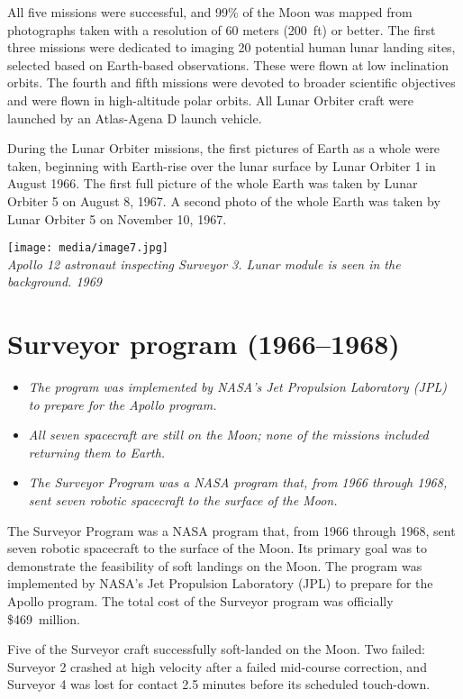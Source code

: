 All five missions were successful, and 99\% of the Moon was mapped from
photographs taken with a resolution of 60 meters (200~ft) or better. The
first three missions were dedicated to imaging 20 potential human lunar
landing sites, selected based on Earth-based observations. These were
flown at low inclination orbits. The fourth and fifth missions were
devoted to broader scientific objectives and were flown in high-altitude
polar orbits. All Lunar Orbiter craft were launched by an Atlas-Agena D
launch vehicle.

During the Lunar Orbiter missions, the first pictures of Earth as a
whole were taken, beginning with Earth-rise over the lunar surface by
Lunar Orbiter 1 in August 1966. The first full picture of the whole
Earth was taken by Lunar Orbiter 5 on August 8, 1967. A second photo of
the whole Earth was taken by Lunar Orbiter 5 on November 10, 1967.

\texttt{[image: media/image7.jpg]}\\
\emph{Apollo 12 astronaut inspecting Surveyor 3. Lunar module is seen in
the background. 1969}

\section{Surveyor program (1966--1968)}\label{surveyor-program-19661968}

\begin{itemize}
\item
  \emph{The program was implemented by NASA's Jet Propulsion Laboratory
  (JPL) to prepare for the Apollo program.}
\item
  \emph{All seven spacecraft are still on the Moon; none of the missions
  included returning them to Earth.}
\item
  \emph{The Surveyor Program was a NASA program that, from 1966 through
  1968, sent seven robotic spacecraft to the surface of the Moon.}
\end{itemize}

The Surveyor Program was a NASA program that, from 1966 through 1968,
sent seven robotic spacecraft to the surface of the Moon. Its primary
goal was to demonstrate the feasibility of soft landings on the Moon.
The program was implemented by NASA's Jet Propulsion Laboratory (JPL) to
prepare for the Apollo program. The total cost of the Surveyor program
was officially \$469~million.

Five of the Surveyor craft successfully soft-landed on the Moon. Two
failed: Surveyor 2 crashed at high velocity after a failed mid-course
correction, and Surveyor 4 was lost for contact 2.5 minutes before its
scheduled touch-down.


